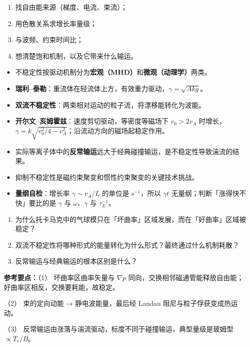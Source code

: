 \documentclass[12pt,a4paper,openany,oneside]{book}
\newcommand{\quizans}[1]{\par\medskip{\color{figGray}\rule{\linewidth}{0.3pt}}\par\smallskip
  {\footnotesize\textbf{参考要点：}#1}}
\newcommand{\grad}{\nabla}
\begin{document}
\begin{strategy}
\small
\begin{enumerate}[leftmargin=1.4em,itemsep=1pt,topsep=2pt]
\item 找自由能来源（梯度、电流、束流）；
\item 用色散关系求增长率量级；
\item 与波频、约束时间比；
\item 想清楚饱和机制，以及它带来什么输运。
\end{enumerate}
\end{strategy}

\begin{chapterreview}
\begin{itemize}
\item 不稳定性按驱动机制分为\textbf{宏观（MHD）}和\textbf{微观（动理学）}两类。
\item \textbf{瑞利--泰勒}：重流体在轻流体上方，有效重力驱动，$\gamma = \sqrt{Akg}$。
\item \textbf{双流不稳定性}：两束相对运动的粒子流，将漂移能转化为波能。
\item \textbf{开尔文--亥姆霍兹}：速度剪切驱动，等密度等磁场下 $v_0>2v_A$ 时增长，$\gamma=k\sqrt{v_0^2/4-v_A^2}$；沿流动方向的磁场起稳定作用。
\item 实际等离子体中的\textbf{反常输运}远大于经典碰撞输运，是不稳定性导致湍流的结果。
\item 抑制不稳定性是磁约束聚变和惯性约束聚变的关键技术挑战。
\item \textbf{量纲自检}：增长率 $\gamma\sim v_A/L$ 的单位是 $\mathrm{s^{-1}}$，所以 $\gamma t$ 无量纲；判断「涨得快不快」要比的是 $\gamma$ 与 $\omega$、$\gamma$ 与 $\tau_E^{-1}$。
\end{itemize}
\end{chapterreview}

\begin{miniquiz}
\begin{enumerate}
\item 为什么托卡马克中的气球模只在「坏曲率」区域发展，而在「好曲率」区域被稳定？
\item 双流不稳定性将哪种形式的能量转化为什么形式？最终通过什么机制耗散？
\item 反常输运与经典输运的根本区别是什么？
\end{enumerate}
\quizans{（1） 坏曲率区曲率矢量与 $\grad p$ 同向，交换相邻磁通管能释放自由能；好曲率区相反，交换要耗能，故稳定。\par （2） 束的定向动能 → 静电波能量，最后经 Landau 阻尼与粒子俘获变成热运动。\par （3） 反常输运由涨落与湍流驱动，标度不同于碰撞输运，典型量级是玻姆型 $\propto T_e/B$。}
\end{miniquiz}
\end{document}
